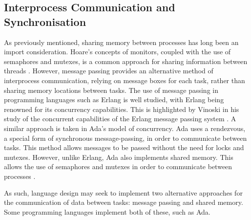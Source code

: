 \subsection{Interprocess Communication and Synchronisation} %
As previously mentioned, sharing memory between processes has long been an import
consideration. Hoare's concepts of monitors, coupled with the use of semaphores
and mutexes, is a common approach for sharing information between threads
\cite{Hoare:1974:MOS:355620.361161}.  However, message passing provides an
alternative method of interprocess communication, relying on message boxes for
each task, rather than sharing memory locations between tasks.  The use of
message passing in programming languages such as Erlang is well studied, with
Erlang being renowned for its concurrency capabilities. This is highlighted by
Vinoski in his study of the concurrent capabilities of the Erlang message
passing system \cite{6216341}. A similar approach is taken in Ada's model of
concurrency. Ada uses a rendezvous, a special form of synchronous
message-passing, in order to communicate between tasks. This method allows
messages to be passed without the need for locks and mutexes. However, unlike
Erlang, Ada also implements shared memory. This allows the use of semaphores
and mutexes in order to communicate between processes
\cite{burns1998concurrency}.  
\par\bigskip\noindent
As such, language design
may seek to implement two alternative approaches for the communication of data
between tasks: message passing and shared memory. Some programming languages
implement both of these, such as Ada.

